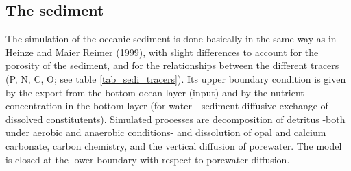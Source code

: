 \documentclass[11pt,a4paper,fleqn,twoside]{article}
\begin{document}
\subsection{\label{sediment}The sediment}

The simulation of the oceanic sediment  is done basically in the same way as in
Heinze and Maier Reimer (1999)\nocite{heinze:1999b}, with slight differences to
account for the porosity of the sediment, and for the relationships between the
different tracers (P, N, C, O; see table \ref{tab_sedi_tracers}). Its upper
boundary condition is given by the export from the bottom ocean layer (input) and by
the nutrient concentration in the bottom layer (for water - sediment diffusive
exchange of dissolved constitutents). Simulated processes are decomposition of
detritus -both under aerobic and anaerobic conditions-  and
dissolution of opal and calcium carbonate, carbon chemistry, and the vertical diffusion
of porewater. The model is closed at the lower boundary with
respect to porewater diffusion.
\end{document}
